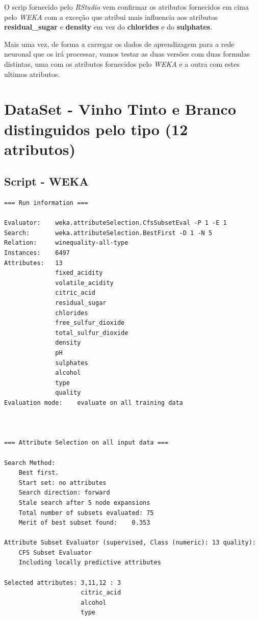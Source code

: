 \documentclass{report}
\begin{document}
O scrip fornecido pelo \textit{RStudio} vem confirmar os atributos fornecidos em cima pelo \textit{WEKA} com a exceção que atribui mais influencia aos atributos \textbf{residual\_sugar} e \textbf{density} em vez do \textbf{chlorides} e do \textbf{sulphates}.

Mais uma vez, de forma a carregar os dados de aprendizagem para a rede neuronal que os irá processar, vamos testar as duas versões com duas formulas distintas, uma com os atributos fornecidos pelo \textit{WEKA} e a outra com estes ultimos atributos.

















\section{DataSet - Vinho Tinto e Branco distinguidos pelo tipo (12 atributos)}
\subsection{Script - WEKA}
\begin{verbatim}
=== Run information ===

Evaluator:    weka.attributeSelection.CfsSubsetEval -P 1 -E 1
Search:       weka.attributeSelection.BestFirst -D 1 -N 5
Relation:     winequality-all-type
Instances:    6497
Attributes:   13
              fixed_acidity
              volatile_acidity
              citric_acid
              residual_sugar
              chlorides
              free_sulfur_dioxide
              total_sulfur_dioxide
              density
              pH
              sulphates
              alcohol
              type
              quality
Evaluation mode:    evaluate on all training data



=== Attribute Selection on all input data ===

Search Method:
	Best first.
	Start set: no attributes
	Search direction: forward
	Stale search after 5 node expansions
	Total number of subsets evaluated: 75
	Merit of best subset found:    0.353

Attribute Subset Evaluator (supervised, Class (numeric): 13 quality):
	CFS Subset Evaluator
	Including locally predictive attributes

Selected attributes: 3,11,12 : 3
                     citric_acid
                     alcohol
                     type
\end{verbatim}
\end{document}
